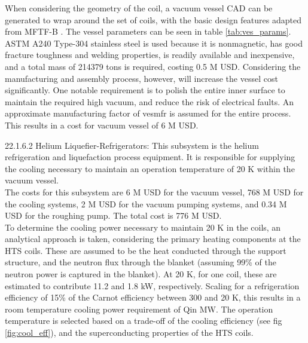 When considering the geometry of the coil, a vacuum vessel CAD can be generated to wrap around the set of coils, with the basic design features adapted from MFTF-B \cite{gerich1986design}. The vessel parameters can be seen in table \ref{tab:ves_params}. ASTM A240 Type-304 stainless steel is used because it is nonmagnetic, has good fracture toughness and welding properties, is readily available and inexpensive, and a total mass of 214379 tons is required, costing 0.5 M USD. Considering the manufacturing and assembly process, however, will increase the vessel cost significantly. One notable requirement is to polish the entire inner surface to maintain the required high vacuum, and reduce the risk of electrical faults. An approximate manufacturing factor of vesmfr is assumed for the entire process. This results in a cost for vacuum vessel of 6 M USD.


\begin{table}[h]
    \centering
    \caption{Vacuum vessel parameters.}
    \label{tab:ves_params}
\end{table}



22.1.6.2 Helium Liquefier-Refrigerators: This subsystem is the helium refrigeration and liquefaction process equipment. It is responsible for supplying the cooling necessary to maintain an operation temperature of 20 K within the vacuum vessel. \\

The costs for this subsystem are 6 M USD for the vacuum vessel, 768 M USD for the cooling systems, 2 M USD for the vacuum pumping systems, and 0.34 M USD for the roughing pump. The total cost is 776 M USD.\\

To determine the cooling power necessary to maintain 20 K in the coils, an analytical approach is taken, considering the primary heating components at the HTS coils. These are assumed to be the heat conducted through the support structure, and the neutron flux through the blanket (assuming 99\% of the neutron power is captured in the blanket). At 20 K, for one coil, these are estimated to contribute 11.2 and 1.8 kW, respectively. Scaling for a refrigeration efficiency of 15\% of the Carnot efficiency between 300 and 20 K, this results in a room temperature cooling power requirement of Qin MW. The operation temperature is selected based on a trade-off of the cooling efficiency (see fig \ref{fig:cool_eff}), and the superconducting properties of the HTS coils.\\


